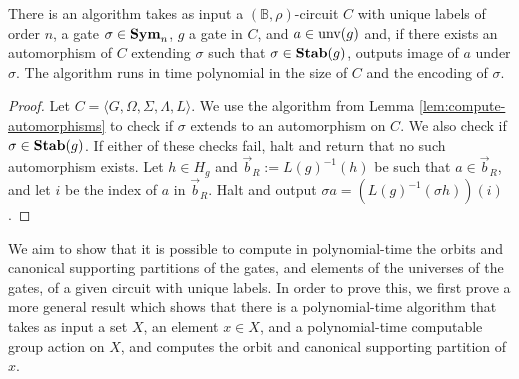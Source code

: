 \documentclass[../paper.tex]{subfiles}
\begin{document}
\begin{lem}
  There is an algorithm takes as input a $(\mathbb{B}, \rho)$-circuit $C$ with
  unique labels of order $n$, a gate $\sigma \in \text{\textbf{Sym}}_n$, $g$ a gate in $C$, and
  $a \in \text{unv}(g)$ and, if there exists an automorphism of $C$ extending
  $\sigma$ such that $\sigma \in \text{\textbf{Stab}}(g)$, outputs image of $a$ under $\sigma$.
  The algorithm runs in time polynomial in the size of $C$ and the encoding of
  $\sigma$.
  \label{lem:compute-automorphisms-labels}
\end{lem}
\begin{proof}
  Let $C = \langle G, \Omega, \Sigma, \Lambda, L \rangle$. We use the algorithm
  from Lemma \ref{lem:compute-automorphisms} to check if $\sigma$ extends to an
  automorphism on $C$. We also check if $\sigma \in \text{\textbf{Stab}}(g)$. If either of
  these checks fail, halt and return that no such automorphism exists. Let $h
  \in H_g$ and $\vec{b}_R := L(g)^{-1}(h)$ be such that $a \in \vec{b}_R$, and
  let $i$ be the index of $a$ in $\vec{b}_R$. Halt and output $\sigma a =
  (L(g)^{-1}(\sigma h))(i)$.
\end{proof}

We aim to show that it is possible to compute in polynomial-time the orbits and
canonical supporting partitions of the gates, and elements of the universes of
the gates, of a given circuit with unique labels. In order to prove this, we
first prove a more general result which shows that there is a polynomial-time
algorithm that takes as input a set $X$, an element $x \in X$, and a
polynomial-time computable group action on $X$, and computes the orbit and
canonical supporting partition of $x$.
\end{document}
